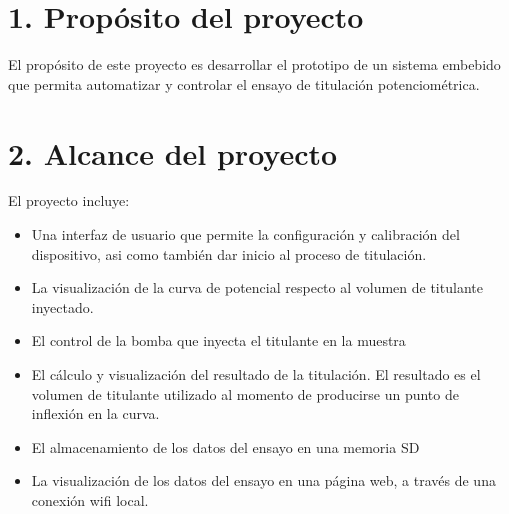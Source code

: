 \documentclass[11pt]{charter}
\begin{document}
 



\section{1. Propósito del proyecto}
\label{sec:proposito}


El propósito de este proyecto es desarrollar el prototipo de un sistema embebido que permita automatizar y controlar el ensayo de titulación potenciométrica.


\section{2. Alcance del proyecto}
\label{sec:alcance}

El proyecto incluye:
\begin{itemize}
\item Una interfaz de usuario que permite la configuración y calibración del dispositivo, asi como también dar inicio al proceso de titulación.
\item La visualización de la curva de potencial respecto al volumen de titulante inyectado.
\item El control de la bomba que inyecta el titulante en la muestra
\item El cálculo y visualización del resultado de la titulación. El resultado es el volumen de titulante utilizado al momento de producirse un punto de inflexión en la curva.
\item El almacenamiento de los datos del ensayo en una memoria SD
\item La visualización de los datos del ensayo en una página web, a través de una conexión wifi local.
\end{itemize}
\end{document}
